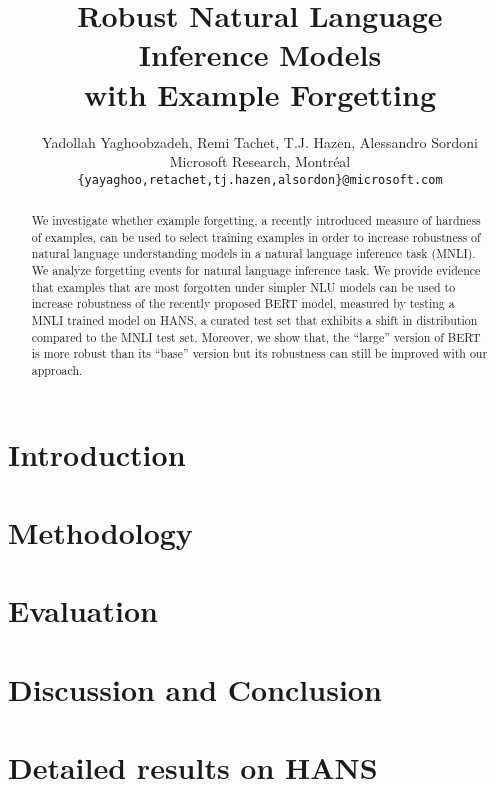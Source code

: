 \documentclass[11pt,a4paper]{article}
\title{Robust Natural Language Inference Models \\ with Example Forgetting}
\author{%
  Yadollah Yaghoobzadeh, Remi Tachet, T.J. Hazen, Alessandro Sordoni \\
  Microsoft Research, Montr\'eal \\
  \small \texttt{\{yayaghoo,retachet,tj.hazen,alsordon\}@microsoft.com}
}
\begin{document}
\maketitle

\begin{abstract}
We investigate whether example forgetting, a recently introduced measure of hardness of examples, can be used to select training examples in order to increase robustness of natural language understanding models in a natural language inference task (MNLI). We analyze forgetting events for natural language inference task. We provide evidence that examples that are most forgotten under simpler NLU models can be used to increase robustness of the recently proposed BERT model, measured by testing a MNLI trained model on HANS, a curated test set that exhibits a shift in distribution compared to the MNLI test set. Moreover, we show that, the ``large'' version of BERT is more robust than its ``base'' version but its robustness can still be improved with our approach.
\end{abstract}

\section{Introduction}


\section{Methodology}


\section{Evaluation}
\label{sec:eval}



\iffalse
\section{Analysis}

\fi


\section{Discussion and Conclusion}





\appendix
\section{Detailed results on HANS}
\label{sec:detailedresults}

\end{document}
